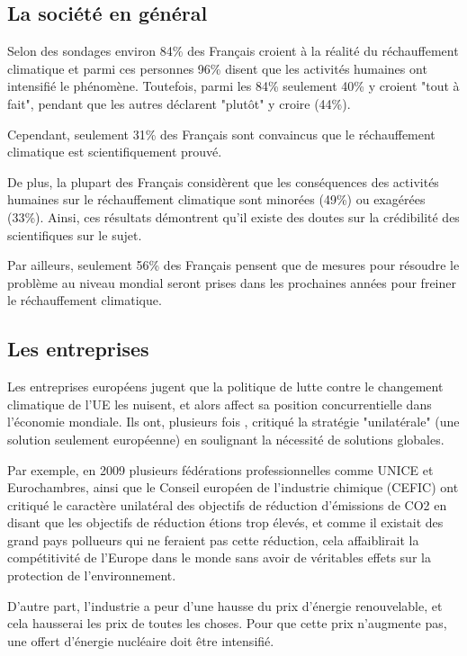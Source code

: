 \documentclass[a4paper,11pt]{article}
\begin{document}
\subsection{La société en général} 

Selon des sondages environ 84\% des Français croient à la réalité du réchauffement
climatique et  parmi ces  personnes  96\% disent que  les activités
humaines ont intensifié le phénomène.
Toutefois, parmi les 84\% seulement 40\% y croient "tout à fait", pendant que les autres déclarent "plutôt" y
croire (44\%). 

Cependant, seulement 31\% des Français sont convaincus que le réchauffement climatique est
scientifiquement prouvé.

De plus, la plupart des Français considèrent que les conséquences des activités humaines
sur le réchauffement climatique sont minorées (49\%) ou exagérées (33\%). 
Ainsi, ces résultats démontrent qu'il existe des doutes sur la crédibilité des scientifiques sur le
sujet. 

Par ailleurs, seulement 56\% des Français pensent que de mesures pour résoudre le
problème au niveau mondial seront prises dans  les prochaines années  pour freiner le réchauffement  climatique.

\subsection{Les entreprises}

Les entreprises européens jugent que la politique  de  lutte  contre  le
changement climatique de l'UE les nuisent, et alors affect sa position concurrentielle dans l'économie
mondiale. Ils  ont, plusieurs  fois , critiqué  la stratégie  "unilatérale" (une
solution seulement européenne) en
soulignant la nécessité de solutions globales.

Par  exemple, en  2009  plusieurs fédérations  professionnelles  comme UNICE  et
Eurochambres, ainsi que le Conseil  européen de l'industrie chimique (CEFIC) ont
critiqué le caractère  unilatéral des objectifs de réduction  d'émissions de CO2
en  disant que  les  objectifs de  réduction  étions trop  élevés,  et comme  il
existait des grand  pays pollueurs qui ne feraient pas  cette réduction, cela
affaiblirait la compétitivité de l'Europe dans le monde sans avoir de véritables effets sur la
protection de l'environnement.

D'autre part, l'industrie a peur d'une hausse du prix d'énergie renouvelable, et
cela hausserai  les prix de  toutes les choses.  Pour que cette  prix n'augmente
pas, une offert d'énergie nucléaire doit être intensifié.
\end{document}
